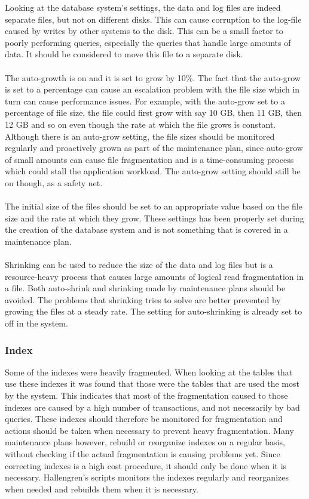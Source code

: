 \documentclass{cslthse-msc}
\begin{document}
\noindent Looking at the database system's settings, the data and log files are indeed separate files, but not on different disks. This can cause corruption to the log-file caused by writes by other systems to the disk. This can be a small factor to poorly performing queries, especially the queries that handle large amounts of data. It should be considered to move this file to a separate disk. \\\\
The auto-growth is on and it is set to grow by 10\%. The fact that the auto-grow is set to a percentage can cause an escalation problem with the file size which in turn can cause performance issues. For example, with the auto-grow set to a percentage of file size, the file could first grow with say 10 GB, then 11 GB, then 12 GB and so on even though the rate at which the file grows is constant. Although there is an auto-grow setting, the file sizes should be monitored regularly and proactively grown as part of the maintenance plan, since auto-grow of small amounts can cause file fragmentation and is a time-consuming process which could stall the application workload. The auto-grow setting should still be on though, as a safety net. \\\\
The initial size of the files should be set to an appropriate value based on the file size and the rate at which they grow. These settings has been properly set during the creation of the database system and is not something that is covered in a maintenance plan.\\\\
Shrinking can be used to reduce the size of the data and log files but is a resource-heavy process that causes large amounts of logical read fragmentation in a file. Both auto-shrink and shrinking made by maintenance plans should be avoided. The problems that shrinking tries to solve are better prevented by growing the files at a steady rate. The setting for auto-shrinking is already set to off in the system.

\subsubsection{Index}
Some of the indexes were heavily fragmented. When looking at the tables that use these indexes it was found that those were the tables that are used the most by the system. This indicates that most of the fragmentation caused to those indexes are caused by a high number of transactions, and not necessarily by bad queries. These indexes should therefore be monitored for fragmentation and actions should be taken when necessary to prevent heavy fragmentation. Many maintenance plans however, rebuild or reorganize indexes on a regular basis, without checking if the actual fragmentation is causing problems yet. Since correcting indexes is a high cost procedure, it should only be done when it is necessary. Hallengren's \cite{Hallengren15} scripts monitors the indexes regularly and reorganizes when needed and rebuilds them when it is necessary.
\end{document}
